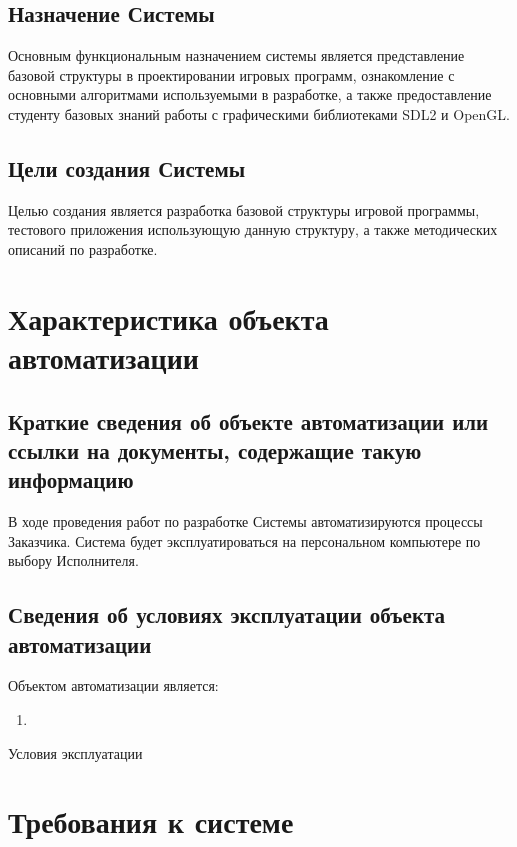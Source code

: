 \section{Назначение Системы}
Основным функциональным назначением системы является представление базовой структуры в 
проектировании игровых программ, ознакомление с основными алгоритмами используемыми в разработке, 
а также предоставление студенту базовых знаний работы с графическими библиотеками SDL2 и OpenGL.

\section{Цели создания Системы}
Целью создания является разработка базовой структуры игровой программы, тестового приложения 
использующую данную структуру, а также методических описаний по разработке.

\chapter{Характеристика объекта автоматизации}
\section{Краткие сведения об объекте автоматизации или ссылки на документы, содержащие такую 
    информацию}
В ходе проведения работ по разработке Системы автоматизируются процессы Заказчика. Система будет 
эксплуатироваться на персональном компьютере по выбору Исполнителя.

\section{Сведения об условиях эксплуатации объекта автоматизации}
Объектом автоматизации является:
\begin{enumerate}
    \item 
\end{enumerate}
Условия эксплуатации

\chapter{Требования к системе}

